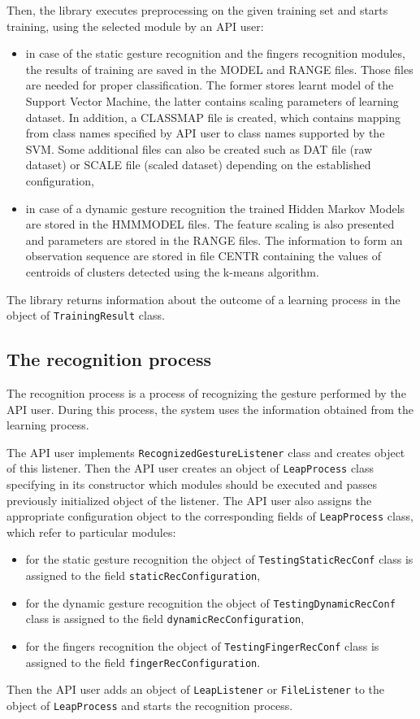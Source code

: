 Then, the library executes preprocessing on the given training set and starts training, using the selected module by an API user:
\begin{itemize}
\item in case of the static gesture recognition and the fingers recognition modules, the results of training are saved in the MODEL and RANGE files. Those files are needed for proper classification. The former stores learnt model of the Support Vector Machine, the latter contains scaling parameters of learning dataset. In addition, a CLASSMAP file is created, which contains mapping from class names specified by API user to class names supported by the SVM. Some additional files can also be created such as DAT file (raw dataset) or SCALE file (scaled dataset) depending on the established configuration,
\item in case of a dynamic gesture recognition the trained Hidden Markov Models are stored in the HMMMODEL files. The feature scaling is also presented and parameters are stored in the RANGE files. The information to form an observation sequence are stored in file CENTR containing the values of centroids of clusters detected using the k-means algorithm. 
\end{itemize}

The library returns information about the outcome of a learning process in the object of \linebreak \texttt{TrainingResult} class.


\subsection{The recognition process}
The recognition process is a process of recognizing the gesture performed by the API user. During this process, the system uses the information obtained from the learning process. 

The API user implements \texttt{RecognizedGestureListener} class and creates object of this listener. Then the API user creates an object of \texttt{LeapProcess} class specifying in its constructor which modules should be executed and passes previously initialized object of the listener. The API user also assigns the appropriate configuration object to the corresponding fields of \texttt{LeapProcess} class, which refer to particular modules:
\begin{itemize}
\item for the static gesture recognition the object of \texttt{TestingStaticRecConf} class is assigned to the field \texttt{staticRecConfiguration},
\item for the dynamic gesture recognition the object of \texttt{TestingDynamicRecConf} class is assigned to the field \texttt{dynamicRecConfiguration},
\item for the fingers recognition the object of \texttt{TestingFingerRecConf} class is assigned to the field \texttt{fingerRecConfiguration}.
\end{itemize}
Then the API user adds an object of \texttt{LeapListener} or \texttt{FileListener} to the object of \texttt{LeapProcess} and starts the recognition process.



